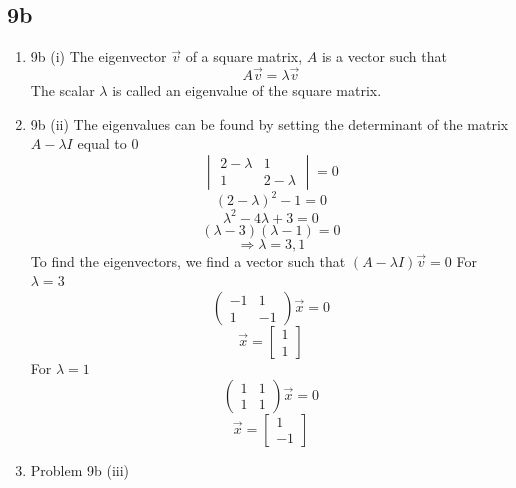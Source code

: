 \documentclass[11pt]{article}
\newcommand{\solution}[1]{{{\color{blue}{\bf Solution:} {#1}}}}
\begin{document}
\subsection{9b}
\begin{enumerate}
\item 9b (i)
\solution{}
The eigenvector $\vec{v}$ of a square matrix, $A$ is a vector such that $$ A\vec{v} = \lambda \vec{v}$$
The scalar $\lambda$ is called an eigenvalue of the square matrix.

\item 9b (ii)
\solution{}
The eigenvalues can be found by setting the determinant of the matrix $ A - \lambda I$ equal to 0
$$
\begin{vmatrix}
2 - \lambda & 1 \\
1 & 2 - \lambda
\end{vmatrix}
 = 0
$$
$$
(2 - \lambda)^2 - 1 = 0
$$
$$
\lambda ^ 2 - 4 \lambda + 3 = 0
$$
$$
(\lambda - 3)(\lambda - 1) = 0
$$
$$
\Rightarrow \lambda = 3, 1
$$
To find the eigenvectors, we find a vector such that $(A - \lambda I)\vec{v} = 0 $
\newline
For $\lambda = 3$
$$
\begin{pmatrix}
-1 & 1 \\
1 & -1 
\end{pmatrix}
\vec{x} = 0
$$
$$
\vec{x} = 
\begin{bmatrix}
1 \\
1
\end{bmatrix}
$$
\newline
For $\lambda = 1$
$$
\begin{pmatrix}
1 & 1 \\
1 & 1
\end{pmatrix}
\vec{x} = 0
$$
$$
\vec{x} = 
\begin{bmatrix}
1 \\
-1
\end{bmatrix}
$$

\item Problem 9b (iii)
\solution{}


\end{enumerate}
\end{document}
